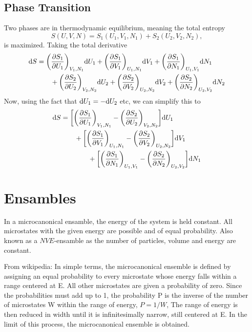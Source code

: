 \documentclass[a4paper, 11pt, notitlepage, english]{article}
\renewcommand{\d}{{\rm d}}
\renewcommand{\b}{\bigg}
\newcommand{\p}{\partial}
\begin{document}
\subsection*{Phase Transition}
Two phases are in thermodynamic equilibrium, meaning the total entropy
$$S(U,V,N) = S_1(U_1,V_1,N_1) + S_2(U_2,V_2,N_2),$$
is maximized. Taking the total derivative
\begin{align*}
\d S &= \b(\frac{\p S_1}{\p U_1}\b)_{V_1, N_1} \d U_1 + \b(\frac{\p S_1}{\p V_1}\b)_{U_1, N_1} \d V_1 + \b(\frac{\p S_1}{\p N_1}\b)_{U_1, V_1} \d N_1 \\
&\qquad + \b(\frac{\p S_2}{\p U_2}\b)_{V_2, N_2} \d U_2 + \b(\frac{\p S_2}{\p V_2}\b)_{U_2, N_2} \d V_2 + \b(\frac{\p S_2}{\p N_2}\b)_{U_2, V_2} \d N_2 \\
\end{align*}
Now, using the fact that $\d U_1 = -\d U_2$ etc, we can simplify this to
\begin{align*}
\d S &= \b[\b(\frac{\p S_1}{\p U_1}\b)_{V_1, N_1} - \b(\frac{\p S_2}{\p U_2}\b)_{V_2, N_2} \b] \d U_1 \\
&\qquad  + \b[\b(\frac{\p S_1}{\p V_1}\b)_{U_1, N_1} - \b(\frac{\p S_2}{\p V_2}\b)_{U_2, N_2}\b]\d V_1 \\
&\qquad\qquad+ \b[\b(\frac{\p S_1}{\p N_1}\b)_{U_1, V_1} - \b(\frac{\p S_2}{\p N_2}\b)_{U_2, V_2} \b]\d N_1 \\
\end{align*}

\clearpage

\section*{Ensambles}

In a microcanonical ensamble, the energy of the system is held constant. All microstates with the given energy are possible and of equal probability. Also known as a $NVE$-ensamble as the number of particles, volume and energy are constant.

From wikipedia:
In simple terms, the microcanonical ensemble is defined by assigning an equal probability to every microstate whose energy falls within a range centered at E. All other microstates are given a probability of zero. Since the probabilities must add up to 1, the probability P is the inverse of the number of microstates W within the range of energy,
$P = 1/W$,
The range of energy is then reduced in width until it is infinitesimally narrow, still centered at E. In the limit of this process, the microcanonical ensemble is obtained.
\end{document}
